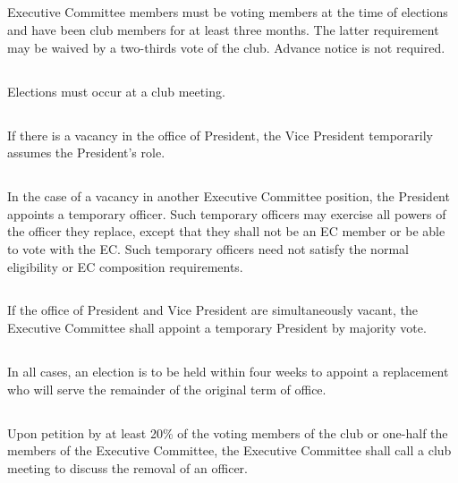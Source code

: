 \documentclass{bylaws}
\begin{document}
\subsection{}Executive Committee members must be voting members at the time of elections and have been club members for at least three months. The latter requirement may be waived by a two-thirds vote of the club. Advance notice is not required.
\subsection{}Elections must occur at a club meeting.

\subsection{}If there is a vacancy in the office of President, the Vice President temporarily assumes the President's role.
\subsection{}In the case of a vacancy in another Executive Committee position, the President appoints a temporary officer. Such temporary officers may exercise all powers of the officer they replace, except that they shall not be an EC member or be able to vote with the EC. Such temporary officers need not satisfy the normal eligibility or EC composition requirements.
\subsection{}If the office of President and Vice President are simultaneously vacant, the Executive Committee shall appoint a temporary President by majority vote.
\subsection{}In all cases, an election is to be held within four weeks to appoint a replacement who will serve the remainder of the original term of office.

\subsection{}Upon petition by at least 20\% of the voting members of the club or one-half the members of the Executive Committee, the Executive Committee shall call a club meeting to discuss the removal of an officer.
\end{document}
